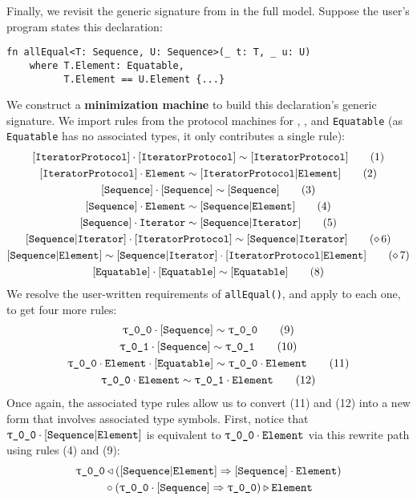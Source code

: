 \documentclass[../generics]{subfiles}
\begin{document}
\begin{example}
Finally, we revisit the generic signature from  in the full model. Suppose the user's program states this declaration:
\begin{Verbatim}
fn allEqual<T: Sequence, U: Sequence>(_ t: T, _ u: U)
    where T.Element: Equatable,
          T.Element == U.Element {...}
\end{Verbatim}
We construct a \textbf{minimization machine} to build this declaration's generic signature. We import rules from the protocol machines for \tIterator, \tSequence, and \texttt{Equatable} (as \texttt{Equatable} has no associated types, it only contributes a single rule):
\begin{gather*}
\ConfRule{\pIterator}{\pIterator} \tag{1}\\
\AssocRule{IteratorProtocol}{Element} \tag{2}\\
\ConfRule{\pSequence}{\pSequence}\tag{3}\\
\AssocRule{Sequence}{Element}\tag{4}\\
\AssocRule{Sequence}{Iterator}\tag{5}\\
\ConfRule{\assocsym{Sequence}{Iterator}}{\pIterator} \tag{\CRule{6}} \\
\SameRule{\assocsym{Sequence}{Element}}{\assocsym{Sequence}{Iterator}\cdot\assocsym{IteratorProtocol}{Element}} \tag{\CRule{7}}\\
\ConfRule{\protosym{Equatable}}{\protosym{Equatable}}\tag{8}
\end{gather*}
We resolve the user-written requirements of \texttt{allEqual()}, and apply  to each one, to get four more rules:
\begin{gather*}
\ConfRule{\rT}{\pSequence}\tag{9}\\
\ConfRule{\rU}{\pSequence}\tag{10}\\
\ConfRule{\rT\cdot\nElement}{\protosym{Equatable}}\tag{11}\\
\SameRule{\rT\cdot\nElement}{\rU\cdot\nElement}\tag{12}
\end{gather*}
Once again, the associated type rules allow us to convert (11) and (12) into a new form that involves associated type symbols. First, notice that $\rT\cdot\assocsym{Sequence}{Element}$ is equivalent to $\rT\cdot\nElement$ via this rewrite path using rules (4) and (9):
\begin{gather*}
\rT \WL (\assocsym{Sequence}{Element} \Rightarrow \pSequence\cdot\nElement)\\
{} \circ (\rT\cdot\pSequence \Rightarrow \rT) \WR \nElement

\end{gather*}
\end{example}
\end{document}
